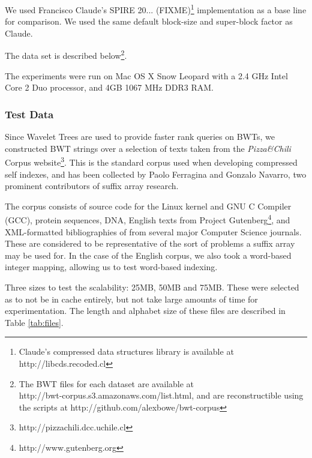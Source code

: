 We used Francisco Claude's SPIRE 20... (FIXME)\footnote{Claude's compressed data 
structures library is available at http://libcds.recoded.cl} implementation as a 
base line for comparison. We used the same default block-size and 
super-block factor as Claude.

The data set is described below\footnote{The BWT files for each dataset are 
available at\\ http://bwt-corpus.s3.amazonaws.com/list.html, and are 
reconstructible using the scripts at http://github.com/alexbowe/bwt-corpus}.

The experiments were run on Mac OS X Snow Leopard with a 2.4 GHz Intel Core 2
Duo processor, and 4GB 1067 MHz DDR3 RAM.

\subsubsection{Test Data}
Since Wavelet Trees are used to provide faster rank queries on BWTs, we
constructed BWT strings over a selection of texts taken from the \emph{Pizza\&Chili}
Corpus website\footnote{http://pizzachili.dcc.uchile.cl}. This is the standard
corpus used when developing compressed self indexes, and has been collected by
Paolo Ferragina and Gonzalo Navarro, two prominent contributors of suffix array 
research.

The corpus consists of source code for the Linux kernel and GNU C Compiler
(GCC), protein sequences, DNA, English texts from Project
Gutenberg\footnote{http://www.gutenberg.org}, and XML-formatted bibliographies
of from several major Computer Science journals. These are considered to be
representative of the sort of problems a suffix array may be used for. In the 
case of the English corpus, we also took a word-based integer mapping, allowing 
us to test word-based indexing.

Three sizes to test the scalability: 25MB, 50MB and 75MB. These were selected as 
to not be in cache entirely, but not take large amounts of time
for experimentation. The length and alphabet size of these files are described 
in Table \ref{tab:files}.

